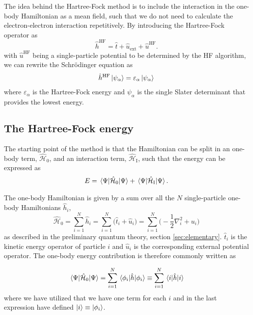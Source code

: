 The idea behind the Hartree-Fock method is to include the interaction in the one-body Hamiltonian as a mean field, such that we do not need to calculate the electron-electron interaction repetitively. By introducing the Hartree-Fock operator as
\begin{equation}
\hat{h}^{\text{HF}}=\hat{t} + \hat{u}_{\text{ext}} + \hat{u}^{\text{HF}}.
\end{equation}
with $\hat{u}^{\text{HF}}$ being a single-particle potential to be determined by the HF algorithm, we can rewrite the Schrödinger equation as
\begin{equation}
\hat{h}^{\text{HF}}\ket{\psi_{\alpha}}=\varepsilon_{\alpha}\ket{\psi_{\alpha}}
\end{equation}
where $\varepsilon_{\alpha}$ is the Hartree-Fock energy and $\psi_{\alpha}$ is the single Slater determinant that provides the lowest energy. 

\subsection{The Hartree-Fock energy}
The starting point of the method is that the Hamiltonian can be split in an one-body term, $\hat{\mathcal{H}}_0$, and an interaction term, $\hat{\mathcal{H}}_{\text{I}}$, such that the energy can be expressed as
\begin{equation}
E=\mel{\Psi}{\hat{\mathcal{H}}_0}{\Psi}+\mel{\Psi}{\hat{\mathcal{H}}_{\text{I}}}{\Psi}.
\end{equation}

The one-body Hamiltonian is given by a sum over all the $N$ single-particle one-body Hamiltonians $\hat{h}_i$,
\begin{equation}
\hat{\mathcal{H}}_0=\sum_{i=1}^N\hat{h}_i=\sum_{i=1}^N\Big(\hat{t}_i+\hat{u}_i\Big)=\sum_{i=1}^N\Big(-\frac{1}{2}\nabla_i^2 + u_i\Big)
\end{equation}
as described in the preliminary quantum theory, section \ref{sec:elementary}. $\hat{t}_i$ is the kinetic energy operator of particle $i$ and $\hat{u}_i$ is the corresponding external potential operator. The one-body energy contribution is therefore commonly written as

\begin{equation}
\mel{\Psi}{\hat{\mathcal{H}}_0}{\Psi}=\sum_{i=1}^N\mel{\phi_i}{\hat{h}}{\phi_i}\equiv\sum_{i=1}^N\mel{i}{\hat{h}}{i}
\end{equation}
where we have utilized that we have one term for each $i$ and in the last expression have defined $\ket{i}\equiv\ket{\phi_i}$. 

